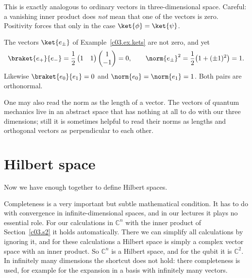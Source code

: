 
This is exactly analogous to ordinary vectors in three-dimensional space. Careful: a vanishing
inner product does \emph{not} mean that one of the vectors is zero. Positivity forces that only
in the case $\ket{\phi} = \ket{\psi}$.

\begin{example}\label{c03.ex.orthogonal}
  The vectors $\ket{e_\pm}$ of Example~\ref{c03.ex.kets} are not zero, and yet
  \begin{equation}\label{c03.eq.orthogonal}
    \braket{e_+}{e_-} = \frac{1}{2} \begin{pmatrix} 1 & 1 \end{pmatrix} \begin{pmatrix} 1 \\ -1 \end{pmatrix} = 0 ,
    \qquad
    \norm{e_\pm}^2 = \frac{1}{2} \bigl( 1 + (\pm 1)^2 \bigr) = 1 .
  \end{equation}
  Likewise $\braket{e_0}{e_1} = 0$ and $\norm{e_0} = \norm{e_1} = 1$. Both pairs are
  orthonormal.
\end{example}

One may also read the norm as the length of a vector. The vectors of quantum mechanics live in
an abstract space that has nothing at all to do with our three dimensions; still it is sometimes
helpful to read their norms as lengths and orthogonal vectors as perpendicular to each other.

\section{Hilbert space}\label{c03.s6}

Now we have enough together to define Hilbert spaces.


Completeness is a very important but subtle mathematical condition. It has to do with
convergence in infinite-dimensional spaces, and in our lectures it plays no essential role. For
our calculations in $\mathbb{C}^n$ with the inner product of Section~\ref{c03.s2} it holds
automatically. There we can simplify all calculations by ignoring it, and for
these calculations a Hilbert space is simply a complex vector space with an inner product. So
$\mathbb{C}^n$ is a Hilbert space, and for the qubit it is $\mathbb{C}^2$. In infinitely many
dimensions the shortcut does not hold: there completeness is used, for example for the
expansion in a basis with infinitely many vectors.

